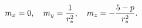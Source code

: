 \begin{equation}
m_{x}=0,\quad
m_{y}={1\over r^{2}_{*}},\quad 
m_{z}=-{5-p\over r_{*}^{2}}.
\end{equation}

